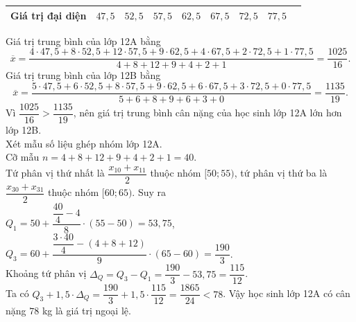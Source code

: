 \begin{ex}
{\begin{itemchoice}
\begin{center}
\begin{tabular}{|c|c|c|c|c|c|c|c|c|}
					\hline
					\textbf{Giá trị đại diện} & $47{,}5$ &$52{,}5$ & $57{,}5$ & $62{,}5$ & $67{,}5$& $72{,}5$&$77{,}5$\\
					\hline
				\end{tabular}
			\end{center}
			 Giá trị trung bình của lớp 12A bằng
			 $$\overline{x}=\dfrac{4\cdot 47{,}5+8\cdot 52{,}5+12\cdot 57{,}5+9\cdot 62{,}5+4\cdot 67{,}5+2\cdot 72{,}5+1\cdot 77{,}5}{4+8 +12+9+4+2+1}=\dfrac{1025}{16}.$$
			  Giá trị trung bình của lớp 12B bằng
			 $$\overline{x}=\dfrac{5\cdot 47{,}5+6\cdot 52{,}5+8\cdot 57{,}5+9\cdot 62{,}5+6\cdot 67{,}5+3\cdot 72{,}5+0\cdot 77{,}5}{5+6+8+9+6+3+0}=\dfrac{1135}{19}.$$
			 Vì $\dfrac{1025}{16}>\dfrac{1135}{19}$, nên giá trị trung bình cân nặng của học sinh lớp 12A  lớn hơn lớp 12B.
			\\
			Xét mẫu số liệu ghép nhóm lớp 12A.\\
			Cỡ mẫu $n= 4+8 +12+9+4+2+1= 40$.\\
			Tứ phân vị thứ nhất là $\dfrac{x_{10}+x_{11}}{2}$ thuộc nhóm $[50; 55)$, tứ phân vị thứ ba là $\dfrac{x_{30}+x_{31}}{2}$ thuộc nhóm $[60; 65)$. Suy ra\\
			$Q_1=50+\dfrac{\dfrac{40}{4}-4}{8}\cdot(55-50)= 53{,}75$,\\ $Q_3=60+\dfrac{\dfrac{3\cdot40}{4}-(4+8+12)}{9}\cdot(65-60)= \dfrac{190}{3}$.\\
			Khoảng tứ phân vị $\Delta_Q=Q_3-Q_1=\dfrac{190}{3}-53{,}75=\dfrac{115}{12}$.\\
			Ta có $Q_3+1{,}5\cdot\Delta_Q=\dfrac{190}{3}+1{,}5\cdot\dfrac{115}{12}=\dfrac{1865}{24}<78$. Vậy học sinh lớp 12A có cân nặng $78$ kg là giá trị ngoại lệ.
				\end{itemchoice}
	}
\end{ex}

